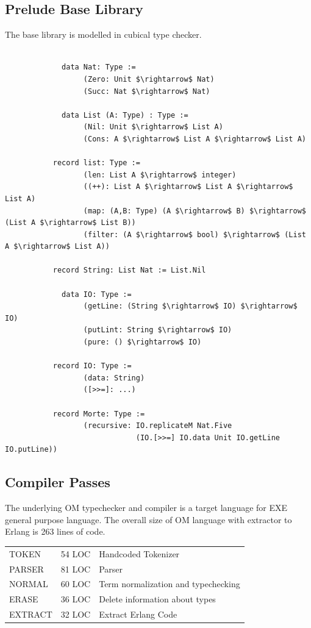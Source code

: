 \documentclass[11pt,oneside]{article}
\begin{document}
\newpage
\subsection{Prelude Base Library}

The base library is modelled in cubical type checker.

\begin{lstlisting}[mathescape=true]

             data Nat: Type :=
                  (Zero: Unit $\rightarrow$ Nat)
                  (Succ: Nat $\rightarrow$ Nat)

             data List (A: Type) : Type :=
                  (Nil: Unit $\rightarrow$ List A)
                  (Cons: A $\rightarrow$ List A $\rightarrow$ List A)

           record list: Type :=
                  (len: List A $\rightarrow$ integer)
                  ((++): List A $\rightarrow$ List A $\rightarrow$ List A)
                  (map: (A,B: Type) (A $\rightarrow$ B) $\rightarrow$ (List A $\rightarrow$ List B))
                  (filter: (A $\rightarrow$ bool) $\rightarrow$ (List A $\rightarrow$ List A))

           record String: List Nat := List.Nil

             data IO: Type :=
                  (getLine: (String $\rightarrow$ IO) $\rightarrow$ IO)
                  (putLint: String $\rightarrow$ IO)
                  (pure: () $\rightarrow$ IO)

           record IO: Type :=
                  (data: String)
                  ([>>=]: ...)

           record Morte: Type :=
                  (recursive: IO.replicateM Nat.Five
                              (IO.[>>=] IO.data Unit IO.getLine IO.putLine))

\end{lstlisting}

\subsection{Compiler Passes}

The underlying OM typechecker and compiler is a target language for EXE general purpose language.
The overall size of OM language with extractor to Erlang is 263 lines of code.

\begin{center}
\begin{tabular}{lll}
   TOKEN   & 54 LOC & Handcoded Tokenizer\\
   PARSER  & 81 LOC & Parser\\
   NORMAL  & 60 LOC & Term normalization and typechecking\\
   ERASE   & 36 LOC & Delete information about types\\
   EXTRACT & 32 LOC & Extract Erlang Code\\
\end{tabular}
\end{center}
\end{document}
